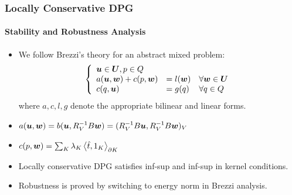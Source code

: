 \documentclass[18pt,xcolor=table]{beamer}
\begin{document}
\begin{frame}
\frametitle{Locally Conservative DPG}
\framesubtitle{Stability and Robustness Analysis}
\begin{itemize}
\item We follow Brezzi's theory for an abstract mixed problem:
\begin{equation*}
\left\{
\begin{array}{lll}
\boldsymbol u \in \boldsymbol U, p \in Q\\
a(\boldsymbol u,\boldsymbol w) + c(p,\boldsymbol w) & = l(\boldsymbol w) & \forall \boldsymbol w \in \boldsymbol U \\
c(q,\boldsymbol u) & = g(q) & \forall q \in Q
\end{array}
\right.
\end{equation*}
where $a,c,l,g$ denote the appropriate
bilinear and linear forms. 
\item $a(\boldsymbol u,\boldsymbol w)=b(\boldsymbol u,R_V^{-1}B\boldsymbol w)=(R_V^{-1}B\boldsymbol u,R_V^{-1}B\boldsymbol w)_V$
\item $c(p,\boldsymbol w)=\sum_K\lambda_K\left\langle \hat t,1_K \right\rangle_{\partial K}$

\item Locally conservative DPG satisfies inf-sup and inf-sup in kernel conditions.

\item Robustness is proved by switching to energy norm in Brezzi analysis.

\end{itemize}
\end{frame}
\end{document}
